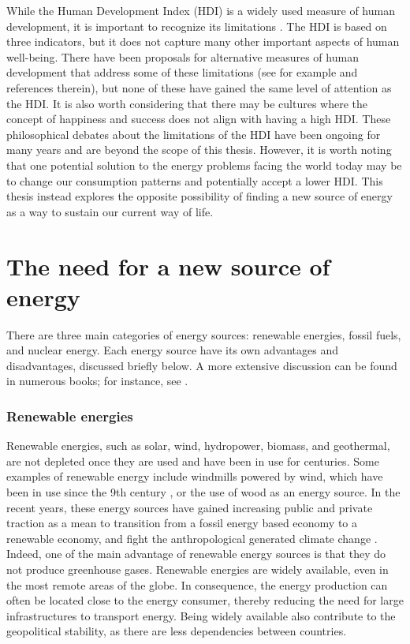 \documentclass[my_thesis.tex]{subfiles}
\begin{document}
While the Human Development Index (HDI) is a widely used measure of human development, it is important to recognize its limitations \citep{mcgillivrayMeasuringDevelopmentUNDP1993a,bagolinHumanDevelopmentIndex2008,dervisMeasuringHumanProgress2011}. The HDI is based on three indicators, but it does not capture many other important aspects of human well-being. There have been proposals for alternative measures of human development that address some of these limitations (see for example \citep{biggeriMoreSustainableHuman2018} and references therein), but none of these have gained the same level of attention as the HDI. It is also worth considering that there may be cultures where the concept of happiness and success does not align with having a high HDI. These philosophical debates about the limitations of the HDI have been ongoing for many years and are beyond the scope of this thesis. However, it is worth noting that one potential solution to the energy problems facing the world today may be to change our consumption patterns and potentially accept a lower HDI. This thesis instead explores the opposite possibility of finding a new source of energy as a way to sustain our current way of life.

\section{The need for a new source of energy}

There are three main categories of energy sources: renewable energies, fossil fuels, and nuclear energy. Each energy source have its own advantages and disadvantages, discussed briefly below. A more extensive discussion can be found in numerous books; for instance, see \citet{parisiFutureFusionEnergy2018}.

\subsubsection{Renewable energies}
Renewable energies, such as solar, wind, hydropower, biomass, and geothermal, are not depleted once they are used and have been in use for centuries. Some examples of renewable energy include windmills powered by wind, which have been in use since the 9th century \citep{glickMedievalScienceTechnology2005}, or the use of wood as an energy source. In the recent years, these energy sources have gained increasing public and private traction as a mean to transition from a fossil energy based economy to a renewable economy, and fight the anthropological generated climate change \citep{allanIPCC2021Summary}. Indeed, one of the main advantage of renewable energy sources is that they do not produce greenhouse gases. Renewable energies are widely available, even in the most remote areas of the globe. In consequence, the energy production can often be located close to the energy consumer, thereby reducing the need for large infrastructures to transport energy. Being widely available also contribute to the geopolitical stability, as there are less dependencies between countries.
\end{document}
